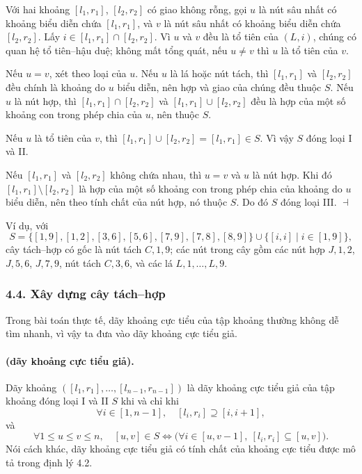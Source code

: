 \documentclass[11pt]{article}
\providecommand{\square}{\dashv}
\begin{document}
Với hai khoảng $[l_1,r_1]$, $[l_2,r_2]$ có giao không rỗng, gọi $u$ là nút sâu
nhất có khoảng biểu diễn chứa $[l_1,r_1]$, và $v$ là nút sâu nhất có khoảng
biểu diễn chứa $[l_2,r_2]$. Lấy $i\in[l_1,r_1]\cap[l_2,r_2]$. Vì $u$ và $v$
đều là tổ tiên của $(L,i)$, chúng có quan hệ tổ tiên--hậu duệ; không mất tổng
quát, nếu $u\ne v$ thì $u$ là tổ tiên của $v$.

Nếu $u=v$, xét theo loại của $u$. Nếu $u$ là lá hoặc nút tách, thì
$[l_1,r_1]$ và $[l_2,r_2]$ đều chính là khoảng do $u$ biểu diễn, nên hợp và
giao của chúng đều thuộc $S$. Nếu $u$ là nút hợp, thì $[l_1,r_1]\cap[l_2,r_2]$
và $[l_1,r_1]\cup[l_2,r_2]$ đều là hợp của một số khoảng con trong phép chia
của $u$, nên thuộc $S$.

Nếu $u$ là tổ tiên của $v$, thì
$[l_1,r_1]\cup[l_2,r_2]=[l_1,r_1]\in S$.
Vì vậy $S$ đóng loại I và II.

Nếu $[l_1,r_1]$ và $[l_2,r_2]$ không chứa nhau, thì $u=v$ và $u$ là nút hợp.
Khi đó $[l_1,r_1]\setminus[l_2,r_2]$ là hợp của một số khoảng con trong phép
chia của khoảng do $u$ biểu diễn, nên theo tính chất của nút hợp, nó thuộc
$S$. Do đó $S$ đóng loại III. \hfill$\square$

Ví dụ, với
\[
  S=\{[1,9],[1,2],[3,6],[5,6],[7,9],[7,8],[8,9]\}
  \cup\{[i,i]\mid i\in[1,9]\},
\]
cây tách--hợp có gốc là nút tách $C,1,9$; các nút trong cây gồm các nút hợp
$J,1,2$, $J,5,6$, $J,7,9$, nút tách $C,3,6$, và các lá $L,1,\ldots,L,9$.

\subsubsection*{4.4. Xây dựng cây tách--hợp}

Trong bài toán thực tế, dãy khoảng cực tiểu của tập khoảng thường không dễ tìm
nhanh, vì vậy ta đưa vào dãy khoảng cực tiểu giả.

\paragraph{ (dãy khoảng cực tiểu giả).}
Dãy khoảng $([l_1,r_1],\ldots,[l_{n-1},r_{n-1}])$ là dãy khoảng cực tiểu giả
của tập khoảng đóng loại I và II $S$ khi và chỉ khi
\[
  \forall i\in[1,n-1],\quad [l_i,r_i]\supseteq[i,i+1],
\]
và
\[
  \forall 1\le u\le v\le n,\quad
  [u,v]\in S
  \Longleftrightarrow
  \bigl(\forall i\in[u,v-1],\ [l_i,r_i]\subseteq[u,v]\bigr).
\]
Nói cách khác, dãy khoảng cực tiểu giả có tính chất của khoảng cực tiểu được
mô tả trong định lý 4.2.
\end{document}
